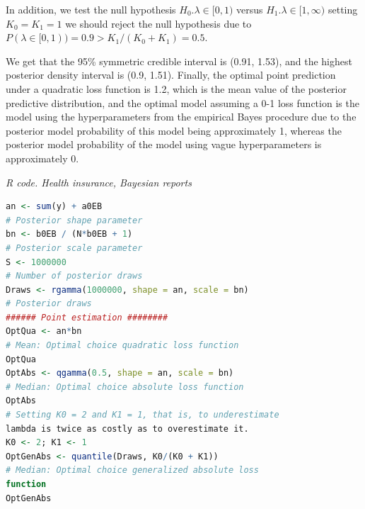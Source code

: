 In addition, we test the null hypothesis $H_0. \lambda \in [0,1)$ versus $H_1. \lambda \in [1,\infty)$ setting $K_0=K_1=1$ we should reject the null hypothesis due to $P(\lambda \in [0,1))=0.9>K_1/(K_0+K_1)=0.5$.

We get that the 95\% symmetric credible interval is (0.91, 1.53), and the highest posterior density interval is (0.9, 1.51). Finally, the optimal point prediction under a quadratic loss function is 1.2, which is the mean value of the posterior predictive distribution, and the optimal model assuming a 0-1 loss function is the model using the hyperparameters from the empirical Bayes procedure due to the posterior model probability of this model being approximately 1, whereas the posterior model probability of the model using vague hyperparameters is approximately 0.

\begin{tcolorbox}[enhanced,width=4.67in,center upper,
	fontupper=\large\bfseries,drop shadow southwest,sharp corners]
	\textit{R code. Health insurance, Bayesian reports}
\begin{VF}
\begin{lstlisting}[basicstyle=\footnotesize, language=R]
an <- sum(y) + a0EB 
# Posterior shape parameter
bn <- b0EB / (N*b0EB + 1) 
# Posterior scale parameter
S <- 1000000 
# Number of posterior draws
Draws <- rgamma(1000000, shape = an, scale = bn) 
# Posterior draws
###### Point estimation ########
OptQua <- an*bn 
# Mean: Optimal choice quadratic loss function
OptQua
OptAbs <- qgamma(0.5, shape = an, scale = bn) 
# Median: Optimal choice absolute loss function
OptAbs
# Setting K0 = 2 and K1 = 1, that is, to underestimate
lambda is twice as costly as to overestimate it.
K0 <- 2; K1 <- 1
OptGenAbs <- quantile(Draws, K0/(K0 + K1)) 
# Median: Optimal choice generalized absolute loss 
function
OptGenAbs
\end{lstlisting}
\end{VF}
\end{tcolorbox}


